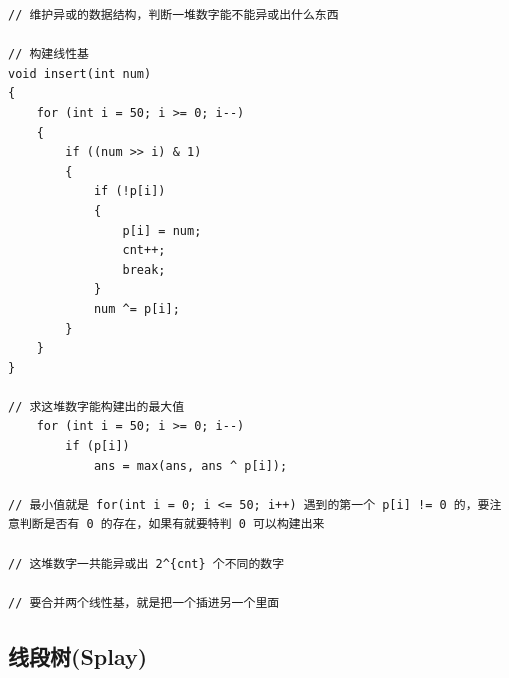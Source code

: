 \documentclass[11pt,a4paper]{ctexart}
\begin{document}
\begin{lstlisting}
// 维护异或的数据结构，判断一堆数字能不能异或出什么东西

// 构建线性基
void insert(int num)
{
    for (int i = 50; i >= 0; i--)
    {
        if ((num >> i) & 1)
        {
            if (!p[i])
            {
                p[i] = num;
                cnt++;
                break;
            }
            num ^= p[i];
        }
    }
}

// 求这堆数字能构建出的最大值
    for (int i = 50; i >= 0; i--)
        if (p[i])
            ans = max(ans, ans ^ p[i]);

// 最小值就是 for(int i = 0; i <= 50; i++) 遇到的第一个 p[i] != 0 的，要注意判断是否有 0 的存在，如果有就要特判 0 可以构建出来

// 这堆数字一共能异或出 2^{cnt} 个不同的数字

// 要合并两个线性基，就是把一个插进另一个里面
\end{lstlisting}

\subsection{线段树(Splay)}
\end{document}
